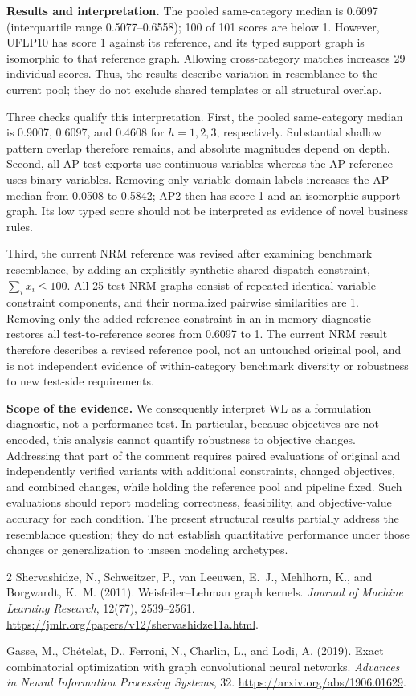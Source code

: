 \documentclass[10pt]{article}
\begin{document}
\textbf{Results and interpretation.} The pooled same-category median is 0.6097
(interquartile range 0.5077--0.6558); 100 of 101 scores are below 1.
However, UFLP10 has score 1 against its reference, and its typed support graph
is isomorphic to that reference graph. Allowing cross-category matches increases
29 individual scores. Thus, the results describe variation in resemblance to
the current pool; they do not exclude shared templates or all structural overlap.

Three checks qualify this interpretation. First, the pooled same-category median
is 0.9007, 0.6097, and 0.4608 for $h=1,2,3$, respectively. Substantial shallow
pattern overlap therefore remains, and absolute magnitudes depend on depth.
Second, all AP test exports use continuous variables whereas the AP reference
uses binary variables. Removing only variable-domain labels increases the AP
median from 0.0508 to 0.5842; AP2 then has score 1 and an isomorphic support graph.
Its low typed score should not be interpreted as evidence of novel business rules.

Third, the current NRM reference was revised after examining benchmark
resemblance, by adding an explicitly synthetic shared-dispatch constraint,
$\sum_i x_i\leq100$. All 25 test NRM graphs consist of repeated identical
variable--constraint components, and their normalized pairwise similarities are
1. Removing only the added reference constraint in an in-memory diagnostic
restores all test-to-reference scores from 0.6097 to 1. The current NRM result
therefore describes a revised reference pool, not an untouched original pool,
and is not independent evidence of within-category benchmark diversity or
robustness to new test-side requirements.

\textbf{Scope of the evidence.} We consequently interpret WL as a formulation
diagnostic, not a performance test. In particular, because objectives are not
encoded, this analysis cannot quantify robustness to objective changes.
Addressing that part of the comment requires paired evaluations of original
and independently verified variants with additional constraints, changed
objectives, and combined changes, while holding the reference pool and pipeline
fixed. Such evaluations should report modeling correctness, feasibility, and
objective-value accuracy for each condition. The present structural results
partially address the resemblance question; they do not establish quantitative
performance under those changes or generalization to unseen modeling archetypes.
\endgroup

\begin{thebibliography}{2}
Shervashidze, N., Schweitzer, P., van Leeuwen, E.~J., Mehlhorn, K., and Borgwardt,
K.~M. (2011). Weisfeiler--Lehman graph kernels.
\emph{Journal of Machine Learning Research}, 12(77), 2539--2561.
\url{https://jmlr.org/papers/v12/shervashidze11a.html}.

Gasse, M., Ch\'{e}telat, D., Ferroni, N., Charlin, L., and Lodi, A. (2019).
Exact combinatorial optimization with graph convolutional neural networks.
\emph{Advances in Neural Information Processing Systems}, 32.
\url{https://arxiv.org/abs/1906.01629}.
\end{thebibliography}
\end{document}
